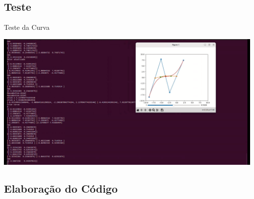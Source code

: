 \documentclass[10pt]{beamer}
\theoremstyle{definition}
\begin{document}
\subsection{Teste}
\begin{frame}{Teste da Curva}
    \begin{center}
        \includegraphics[width = 1 \linewidth]{teste1.png}
    \end{center}
\end{frame}
\subsection{Elaboração do Código}
\end{document}

